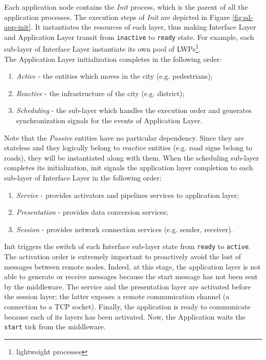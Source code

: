 Each application node contains the \textit{Init} process,
which is the parent of all the application processes.
The execution steps of \textit{Init} are depicted in Figure
\ref{fig:sd-app-init}.
It instantiates the resources of each layer, thus making
Interface Layer and Application Layer transit from \verb|inactive|
to \verb|ready| state.
For example, each sub-layer of Interface Layer instantiate its own pool of
LWPs\footnote{lightweight processes}.
\\
The Application Layer initialization completes in the following order:
\begin{enumerate}
  \item \textit{Active} - the entities which moves in the city
  (e.g. pedestrians);
  \item \textit{Reactive} - the infrastructure of the city (e.g. district);
  \item \textit{Scheduling} - the sub-layer which handles the execution order
  and generates synchronization signals for the events of Application Layer.
\end{enumerate}
Note that the \textit{Passive} entities have no particular dependency. Since
they are stateless and they logically belong to \textit{reactive} entities
(e.g. road signs belong to roads), they will be instantiated along with them.
When the scheduling sub-layer completes its initialization, init signals
the application layer completion to each sub-layer of Interface Layer in the
following order:
\begin{enumerate}
  \item \textit{Service} - provides activators and pipelines services to
  application layer;
  \item \textit{Presentation} - provides data conversion services;
  \item \textit{Session} - provides network connection services
  (e.g. sender, receiver).
\end{enumerate}
Init triggers the switch of each Interface sub-layer state from
\verb|ready| to \verb|active|.
The activation order is extremely important to
proactively avoid the lost of messages between remote nodes. Indeed, at this
stage, the application layer is not able to generate or receive messages
because the start message has not been sent by the middleware.
The service and
the presentation layer are activated before the session layer; the latter
exposes a remote communication channel (a connection to a TCP socket).
Finally, the application is ready to communicate because each of its layers
has been activated. Now, the Application waits the \verb|start| tick from the
middleware.


